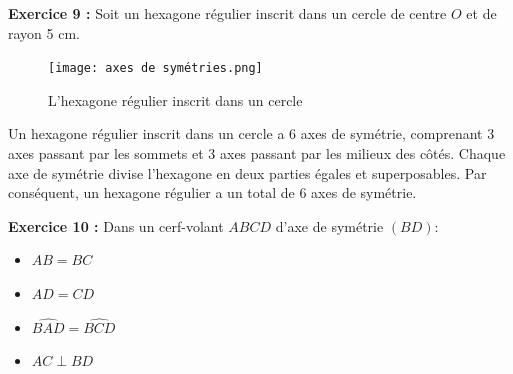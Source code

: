 \documentclass{article}
\begin{document}
\begin{tcolorbox}[colback=green!10!white, colframe=green!75!black, title=\textcolor{white}{Corrections des Exercices avec Graphiques}, sharp corners=south]
\begin{center}
\end{center}
\end{tcolorbox}

\begin{tcolorbox}[colback=green!10!white, colframe=green!75!black, title=\textcolor{white}{Corrections des Exercices avec Graphiques}, sharp corners=south]

        \textbf{Exercice 9 :} Soit un hexagone régulier inscrit dans un cercle de centre \( O \) et de rayon 5 cm.

        \begin{figure}[H]
            \centering
            \texttt{[image: axes de symétries.png]}
            \caption{L'hexagone régulier inscrit dans un cercle}
            \label{fig:enter-label}
        \end{figure}

        Un hexagone régulier inscrit dans un cercle a 6 axes de symétrie, comprenant 3 axes passant par les sommets et 3 axes passant par les milieux des côtés. Chaque axe de symétrie divise l'hexagone en deux parties égales et superposables. Par conséquent, un hexagone régulier a un total de 6 axes de symétrie.

        \vspace{0.3cm}

       \begin{multicols}{2} %

\textbf{Exercice 10 :} Dans un cerf-volant \( ABCD \) d'axe de symétrie \( (BD) \):
\begin{itemize}
    \item \( AB = BC \)
    \item \( AD = CD \)
    \item \( \widehat{BAD} = \widehat{BCD} \)
    \item \( AC \perp BD \)
\end{itemize}

\columnbreak %

\begin{center}
\end{center}
\end{multicols}
\end{tcolorbox}
\end{document}
